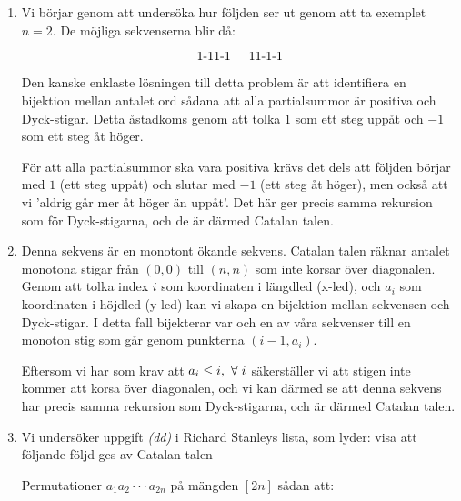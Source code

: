 \documentclass{tufte-handout}
\begin{document}
\begin{ans}
  \hspace{1cm}
  \begin{enumerate}
    \item\noindent 
      Vi börjar genom att undersöka hur följden ser ut genom att ta exemplet $n = 2$. De möjliga sekvenserna blir då:

      \begin{equation}
        \text{1-11-1} \hspace{5mm} \text{11-1-1}
      \end{equation}

      \noindent
      Den kanske enklaste lösningen till detta problem är att identifiera en bijektion mellan antalet ord sådana att alla partialsummor är positiva och Dyck-stigar. Detta åstadkoms genom att tolka $1$ som ett steg uppåt och $-1$ som ett steg åt höger.\newline

      \noindent
      För att alla partialsummor ska vara positiva krävs det dels att följden börjar med $1$ (ett steg uppåt) och slutar med $-1$ (ett steg åt höger), men också att vi 'aldrig går mer åt höger än uppåt'. Det här ger precis samma rekursion som för Dyck-stigarna, och de är därmed Catalan talen.
      \par\bigskip
    \item 
      Denna sekvens är en monotont ökande sekvens. Catalan talen räknar antalet monotona stigar från $(0,0)$ till $(n,n)$ som inte korsar över diagonalen. Genom att tolka index $i$ som koordinaten i längdled (x-led), och $a_i$ som koordinaten i höjdled (y-led) kan vi skapa en bijektion mellan sekvensen och Dyck-stigar. I detta fall bijekterar var och en av våra sekvenser till en monoton stig som går genom punkterna $(i-1, a_i)$.\newline

      \noindent
      Eftersom vi har som krav att $a_i \leq i, \forall \hspace{1mm} i$ säkerställer vi att stigen inte kommer att korsa över diagonalen, och vi kan därmed se att denna sekvens har precis samma rekursion som Dyck-stigarna, och är därmed Catalan talen.
      \par\bigskip
    \item 
      Vi undersöker uppgift \textit{(dd)} i Richard Stanleys lista, som lyder: visa att följande följd ges av Catalan talen \newline

      \noindent
      Permutationer $a_1a_2\cdot\cdot\cdot a_{2n}$ på mängden $[2n]$ sådan att:


\end{enumerate}
\end{ans}
\end{document}
